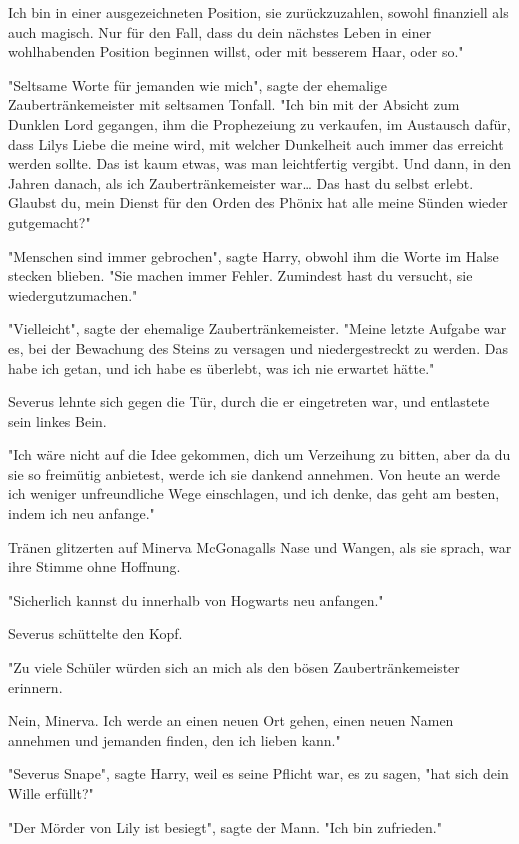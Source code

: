 {Ich bin in einer ausgezeichneten Position, sie zurückzuzahlen, sowohl finanziell als auch magisch. Nur für den Fall, dass du dein nächstes Leben in einer wohlhabenden Position beginnen willst, oder mit besserem Haar, oder so."

"Seltsame Worte für jemanden wie mich", sagte der ehemalige Zaubertränkemeister mit seltsamen Tonfall. "Ich bin mit der Absicht zum Dunklen Lord gegangen, ihm die Prophezeiung zu verkaufen, im Austausch dafür, dass Lilys Liebe die meine wird, mit welcher Dunkelheit auch immer das erreicht werden sollte. Das ist kaum etwas, was man leichtfertig vergibt. Und dann, in den Jahren danach, als ich Zaubertränkemeister war… Das hast du selbst erlebt. Glaubst du, mein Dienst für den Orden des Phönix hat alle meine Sünden wieder gutgemacht?"

"Menschen sind immer gebrochen", sagte Harry, obwohl ihm die Worte im Halse stecken blieben. "Sie machen immer Fehler. Zumindest hast du versucht, sie wiedergutzumachen."

"Vielleicht", sagte der ehemalige Zaubertränkemeister. "Meine letzte Aufgabe war es, bei der Bewachung des Steins zu versagen und niedergestreckt zu werden. Das habe ich getan, und ich habe es überlebt, was ich nie erwartet hätte."

Severus lehnte sich gegen die Tür, durch die er eingetreten war, und entlastete sein linkes Bein.

"Ich wäre nicht auf die Idee gekommen, dich um Verzeihung zu bitten, aber da du sie so freimütig anbietest, werde ich sie dankend annehmen. Von heute an werde ich weniger unfreundliche Wege einschlagen, und ich denke, das geht am besten, indem ich neu anfange."

Tränen glitzerten auf Minerva McGonagalls Nase und Wangen, als sie sprach, war ihre Stimme ohne Hoffnung.

"Sicherlich kannst du innerhalb von Hogwarts neu anfangen."

Severus schüttelte den Kopf.

"Zu viele Schüler würden sich an mich als den bösen Zaubertränkemeister erinnern.

Nein, Minerva. Ich werde an einen neuen Ort gehen, einen neuen Namen annehmen und jemanden finden, den ich lieben kann."

"Severus Snape", sagte Harry, weil es seine Pflicht war, es zu sagen, "hat sich dein Wille erfüllt?"

"Der Mörder von Lily ist besiegt", sagte der Mann. "Ich bin zufrieden."

}

